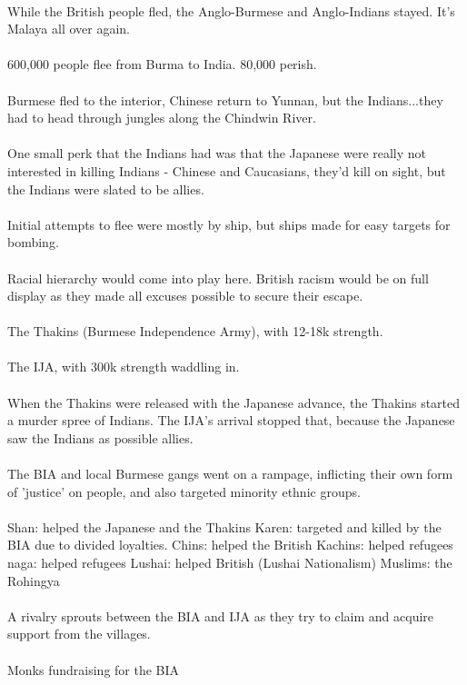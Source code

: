 \documentclass[a4paper]{article}
\begin{document}
\\
While the British people fled, the Anglo-Burmese and Anglo-Indians stayed. It's Malaya all over again.\\
\\
600,000 people flee from Burma to India. 80,000 perish.\\
\\
Burmese fled to the interior, Chinese return to Yunnan, but the Indians...they had to head through jungles along the Chindwin River.\\
\\
One small perk that the Indians had was that the Japanese were really not interested in killing Indians - Chinese and Caucasians, they'd kill on sight, but the Indians were slated to be allies.\\
\\
Initial attempts to flee were mostly by ship, but ships made for easy targets for bombing.\\
\\
Racial hierarchy would come into play here. British racism would be on full display as they made all excuses possible to secure their escape.\\
\\
The Thakins (Burmese Independence Army), with 12-18k strength.\\
\\
The IJA, with 300k strength waddling in.\\
\\
When the Thakins were released with the Japanese advance, the Thakins started a murder spree of Indians. The IJA's arrival stopped that, because the Japanese saw the Indians as possible allies.\\
\\
The BIA and local Burmese gangs went on a rampage, inflicting their own form of 'justice' on people, and also targeted minority ethnic groups.\\
\\
Shan: helped the Japanese and the Thakins
Karen: targeted and killed by the BIA due to divided loyalties.
Chins: helped the British
Kachins: helped refugees
naga: helped refugees
Lushai: helped British (Lushai Nationalism)
Muslims: the Rohingya\\
\\
A rivalry sprouts between the BIA and IJA as they try to claim and acquire support from the villages.\\
\\
Monks fundraising for the BIA\\
\end{document}
